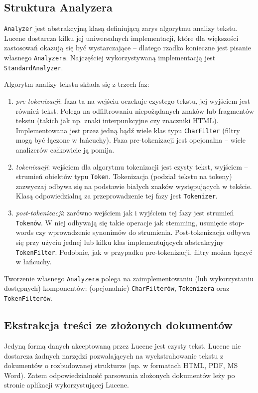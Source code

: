 \subsection{Struktura Analyzera}

\texttt{Analyzer} jest abstrakcyjną klasą definiującą zarys algorytmu analizy tekstu. Lucene dostarcza kilku jej uniwersalnych implementacji, które dla większości zastosowań okazują się być wystarczające -- dlatego rzadko konieczne jest pisanie własnego \texttt{Analyzera}. Najczęściej wykorzystywaną implementacją jest \texttt{StandardAnalyzer}.

Algorytm analizy tekstu składa się z trzech faz:
\begin{enumerate}
 \item \emph{pre-tokenizacji}: faza ta na wejściu oczekuje czystego tekstu, jej wyjściem jest również tekst. Polega na odfiltrowaniu niepożądanych znaków lub fragmentów tekstu (takich jak np. znaki interpunkcyjne czy znaczniki HTML). Implementowana jest przez jedną bądź wiele klas typu \texttt{CharFilter} (filtry mogą być łączone w łańcuchy). Faza pre-tokenizacji jest opcjonalna -- wiele analizerów całkowicie ją pomija.
 \item \emph{tokenizacji}: wejściem dla algorytmu tokenizacji jest czysty tekst, wyjściem -- strumień obiektów typu \texttt{Token}. Tokenizacja (podział tekstu na tokeny) zazwyczaj odbywa się na podstawie białych znaków występujących w tekście. Klasą odpowiedzialną za przeprowadzenie tej fazy jest \texttt{Tokenizer}.
 \item \emph{post-tokenizacji}: zarówno wejściem jak i wyjściem tej fazy jest strumień \texttt{Tokenów}. W niej odbywają się takie operacje jak stemming, usunięcie stop-words czy wprowadzenie synonimów do strumienia. Post-tokenizacja odbywa się przy użyciu  jednej lub kilku klas implementujących abstrakcyjny \texttt{TokenFilter}. Podobnie, jak w przypadku pre-tokenizacji, filtry można łączyć w łańcuchy.
\end{enumerate}

Tworzenie własnego \texttt{Analyzera} polega na zaimplementowaniu (lub wykorzystaniu dostępnych) komponentów: (opcjonalnie) \texttt{CharFilterów}, \texttt{Tokenizera} oraz \texttt{TokenFilterów}. 

\subsection{Ekstrakcja treści ze złożonych dokumentów}

Jedyną formą danych akceptowaną przez Lucene jest czysty tekst. Lucene nie dostarcza żadnych narzędzi pozwalających na wyekstrahowanie tekstu z dokumentów o rozbudowanej strukturze (np. w formatach HTML, PDF, MS Word). Zatem odpowiedzialność parsowania złożonych dokumentów leży po stronie aplikacji wykorzystującej Lucene. 

